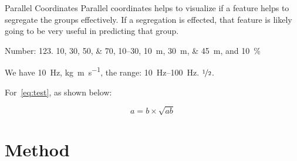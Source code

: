 


Parallel Coordinates 
Parallel coordinates helps to visualize if a feature helps to segregate the groups effectively. If a segregation is effected, that feature is likely going to be very useful in predicting that group.


Number:
\num{123}.
\numlist{10;30;50;70},
\numrange{10}{30},
\SIlist{10;30;45}{\metre},
and
\SI{10}{\percent}



\begin{ConferenceOnly}
We have \SI{10}{\hertz},
\si{\kilogram\metre\per\second},
the range: \SIrange{10}{100}{\hertz}.
$\nicefrac[]{1}{2}$.


\end{ConferenceOnly}


For~\cref{eq:test},
as shown below:

\begin{equation}\label{eq:test}
a = b \times \sqrt{ab}
\end{equation}

\blindmathpaper


\section{Method} \label{sec-method}


